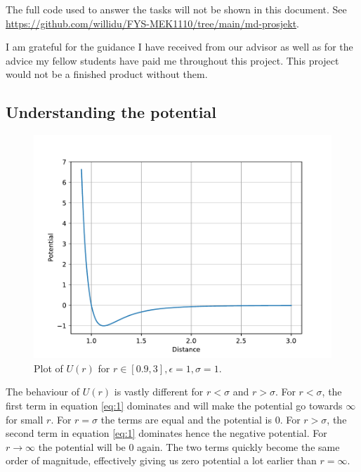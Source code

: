 \documentclass[a4paper,10pt,english]{article}
\begin{document}
The full code used to answer the tasks will not be shown in this document. See \url{https://github.com/willidu/FYS-MEK1110/tree/main/md-prosjekt}.

I am grateful for the guidance I have received from our advisor as well as for the advice my fellow students have paid me throughout this project. This project would not be a finished product without them. 

\subsection{Understanding the potential} \label{1a}

\begin{figure}[h!]
    \centering 
    \includegraphics[scale=.65]{../figures/1_a_i.pdf} 
    \caption{Plot of $U(r)$ for $r\in[0.9, 3], \epsilon=1, \sigma=1$.}
    \label{fig:plot1}
\end{figure}

The behaviour of $U(r)$ is vastly different for $r<\sigma$ and $r>\sigma$. For $r<\sigma$, the first term in equation \ref{eq:1} dominates and will make the potential go towards $\infty$ for small $r$. For $r=\sigma$ the terms are equal and the potential is 0. For $r>\sigma$, the second term in equation \ref{eq:1} dominates hence the negative potential. For $r\to \infty$ the potential will be 0 again. The two terms quickly become the same order of magnitude, effectively giving us zero potential a lot earlier than $r=\infty$.
\end{document}
